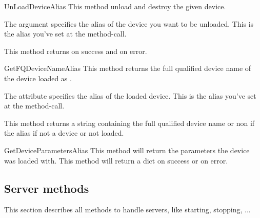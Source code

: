 \begin{methoddesc}[System]{UnLoadDevice}{Alias}
This method unload and destroy the given device. 

The argument  specifies the alias of the device you want to be
unloaded. This is the alias you've set at the  
method-call.

This method returns  on success and  on error.
\end{methoddesc}


\begin{methoddesc}[System]{GetFQDeviceName}{Alias}
This method returns the full qualified device name of the device loaded as
.

The attribute  specifies the alias of the loaded device. This is
the alias you've set at the  method-call.

This method returns a string containing the full qualified device name or non 
if the alias if not a device or not loaded.
\end{methoddesc}


\begin{methoddesc}[System]{GetDeviceParameters}{Alias}
This method will return the parameters the device was loaded with. This method
will return a dict on success or  on error.
\end{methoddesc}


\subsection{Server methods}
This section describes all methods to handle servers, like starting, stopping, ... 

